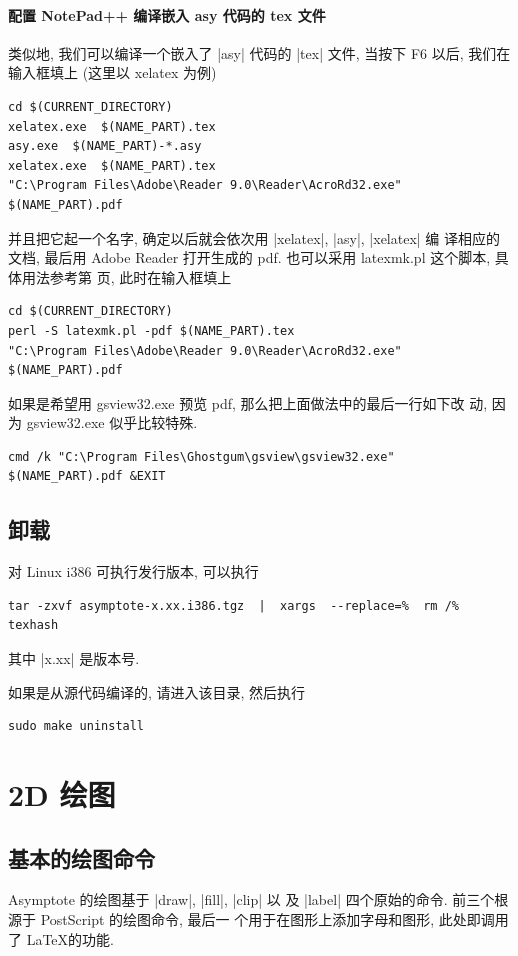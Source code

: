 \documentclass[nofonts,CJKnormalspaces]{ctexbook}
\begin{document}
\subsubsection{配置 NotePad++ 编译嵌入 asy 代码的 tex 文件}
类似地, 我们可以编译一个嵌入了 |asy| 代码的 |tex| 文件, 当按下 F6 以后,
我们在输入框填上 (这里以 xelatex 为例)
\begin{verbatim}
cd $(CURRENT_DIRECTORY)
xelatex.exe  $(NAME_PART).tex
asy.exe  $(NAME_PART)-*.asy
xelatex.exe  $(NAME_PART).tex
"C:\Program Files\Adobe\Reader 9.0\Reader\AcroRd32.exe" $(NAME_PART).pdf
\end{verbatim}
并且把它起一个名字, 确定以后就会依次用 |xelatex|, |asy|, |xelatex| 编
译相应的文档, 最后用 Adobe Reader 打开生成的 pdf.
也可以采用 latexmk.pl 这个脚本, 具体用法参考第 \pageref{asy:latexmk}
页, 此时在输入框填上
\begin{verbatim}
cd $(CURRENT_DIRECTORY)
perl -S latexmk.pl -pdf $(NAME_PART).tex
"C:\Program Files\Adobe\Reader 9.0\Reader\AcroRd32.exe" $(NAME_PART).pdf
\end{verbatim}

如果是希望用 gsview32.exe 预览 pdf, 那么把上面做法中的最后一行如下改
动, 因为 gsview32.exe 似乎比较特殊.
\begin{verbatim}
cmd /k "C:\Program Files\Ghostgum\gsview\gsview32.exe" $(NAME_PART).pdf &EXIT
\end{verbatim}

\section{卸载}
对 Linux i386 可执行发行版本, 可以执行
\begin{verbatim}
tar -zxvf asymptote-x.xx.i386.tgz  |  xargs  --replace=%  rm /%
texhash
\end{verbatim}
其中 |x.xx| 是版本号.

如果是从源代码编译的, 请进入该目录, 然后执行
\begin{verbatim}
sudo make uninstall
\end{verbatim}


\chapter{2D 绘图}

\section{基本的绘图命令}
Asymptote 的绘图基于 |draw|, |fill|, |clip| 以
及 |label| 四个原始的命令. 前三个根源于 PostScript 的绘图命令, 最后一
个用于在图形上添加字母和图形, 此处即调用了 \LaTeX 的功能.
\end{document}
